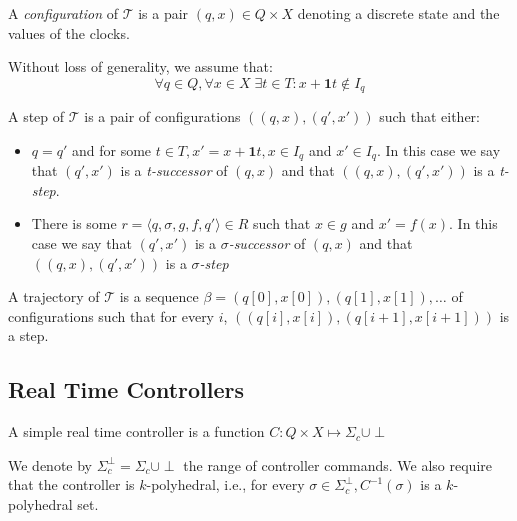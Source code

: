 \documentclass[table]{beamer}
\newcommand{\confPair}{\ensuremath{((q,x),(q',x'))}}
\begin{document}
\begin{frame}
	A \emph{configuration} of $\mathcal{T}$ is a pair $(q,x) \in Q \times X$ denoting a discrete
	state and the values of the clocks.

	\medskip

	Without loss of generality, we assume that:
	$$ \forall q \in Q, \forall x \in X \; \exists t \in T : x+\textbf{1}t \not \in I_q$$
\end{frame}
\begin{frame}
	\begin{dfn}
		A step of $\mathcal{T}$ is a pair of configurations $\confPair$ such that either:
		\begin{itemize}
			\item $q=q'$ and for some $t \in T, x'=x+\textbf{1}t, x \in I_q$ and $x' \in I_q$. In this case we say that $(q',x')$ is a \emph{t-successor} of $(q,x)$ and that $\confPair$ is a \emph{t-step}.
			\item There is some $r = \langle q,\sigma,g,f,q'\rangle \in R$ such that $x \in g$ and $x' = f(x)$. In this case we say that $(q',x')$ is a \emph{$\sigma$-successor} of $(q,x)$ and that $\confPair$ is a \emph{$\sigma$-step} 
		\end{itemize}
		
		\medskip
		
		A trajectory of $\mathcal{T}$ is a sequence $ \beta = (q[0],x[0]),(q[1],x[1]),\ldots $ of configurations such that for every $i$, $((q[i],x[i]),(q[i+1],x[i+1]))$ is a step.
	\end{dfn}
\end{frame}

\subsection{Real Time Controllers}
\begin{frame}
	\begin{dfn}
		A simple real time controller is a function $C: Q \times X \mapsto \Sigma_c \cup {\perp}$
	\end{dfn}
	We denote by $\Sigma_c^\perp = \Sigma_c \cup {\perp}$ the range of controller commands. We also require that the controller is $k$-polyhedral, i.e., for every $\sigma \in \Sigma_c^\perp, C^{-1}(\sigma)$ is  a $k$-polyhedral set.
\end{frame}
\end{document}
